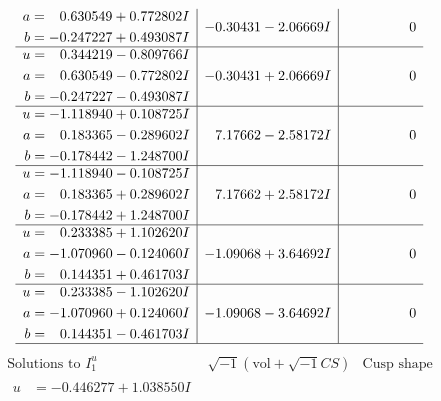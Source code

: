 \documentclass[1p]{elsarticle_modified}
\theoremstyle{definition}
\newcommand{\I}{\sqrt{-1}}
\begin{document}
$$\begin{array}{c|c|c}
\begin{aligned}
a &= \phantom{-}0.630549 + 0.772802 I \\
b &= -0.247227 + 0.493087 I\end{aligned}
 & -0.30431 - 2.06669 I & \phantom{-0.000000 } 0 \\ \hline\begin{aligned}
u &= \phantom{-}0.344219 - 0.809766 I \\
a &= \phantom{-}0.630549 - 0.772802 I \\
b &= -0.247227 - 0.493087 I\end{aligned}
 & -0.30431 + 2.06669 I & \phantom{-0.000000 } 0 \\ \hline\begin{aligned}
u &= -1.118940 + 0.108725 I \\
a &= \phantom{-}0.183365 - 0.289602 I \\
b &= -0.178442 - 1.248700 I\end{aligned}
 & \phantom{-}7.17662 - 2.58172 I & \phantom{-0.000000 } 0 \\ \hline\begin{aligned}
u &= -1.118940 - 0.108725 I \\
a &= \phantom{-}0.183365 + 0.289602 I \\
b &= -0.178442 + 1.248700 I\end{aligned}
 & \phantom{-}7.17662 + 2.58172 I & \phantom{-0.000000 } 0 \\ \hline\begin{aligned}
u &= \phantom{-}0.233385 + 1.102620 I \\
a &= -1.070960 - 0.124060 I \\
b &= \phantom{-}0.144351 + 0.461703 I\end{aligned}
 & -1.09068 + 3.64692 I & \phantom{-0.000000 } 0 \\ \hline\begin{aligned}
u &= \phantom{-}0.233385 - 1.102620 I \\
a &= -1.070960 + 0.124060 I \\
b &= \phantom{-}0.144351 - 0.461703 I\end{aligned}
 & -1.09068 - 3.64692 I & \phantom{-0.000000 } 0\\
 \hline 
 \end{array}$$\newpage$$\begin{array}{c|c|c}  
\text{Solutions to }I^u_{1}& \I (\text{vol} + \sqrt{-1}CS) & \text{Cusp shape}\\
 \hline 
\begin{aligned}
u &= -0.446277 + 1.038550 I \\

\end{aligned}
\end{array}$$
\end{document}

